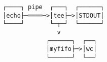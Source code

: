 \documentclass[varwidth,crop]{standalone}
\begin{document}
\begin{verbatim}
┌────┐ pipe  ┌───┐  ┌──────┐
│echo├─════─>│tee├─>│STDOUT│
└────┘       └─┬─┘  └──────┘
               v
            ┌──────┐  ┌──┐
            │myfifo├─>│wc│
            └──────┘  └──┘
\end{verbatim}
\end{document}
